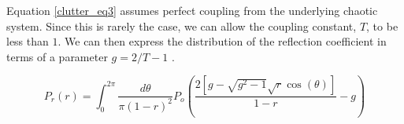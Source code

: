 \documentclass[12pt,twoside]{paper}
\begin{document}
Equation \ref{clutter_eq3} assumes perfect coupling from the underlying chaotic system. Since this is rarely the case, we can allow the coupling constant, $T$, to be less than $1$. We can then express the distribution of the reflection coefficient in terms of a parameter $g = 2/T - 1$ \cite{fyodorov_statistics}.

\begin{equation}
\label{clutter_eq_4}
P_r(r) = \int_0^{2\pi}\frac{d\theta}{\pi(1-r)^2}P_o\left(\frac{2\left[g-\sqrt{g^2-1}\sqrt{r}\cos(\theta) \right]}{1-r} -g \right)
\end{equation}

     

\end{document}
